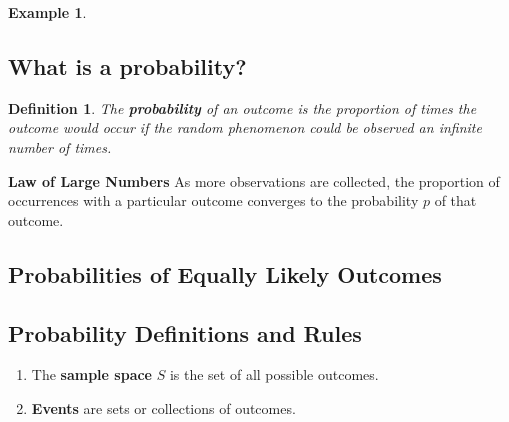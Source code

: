\documentclass[12pt]{amsart}
\newtheorem{definition}[theorem]{Definition}
\newtheorem{example}[theorem]{Example}
\begin{document}
{\begin{example}
\begin{enumerate}
\begin{enumerate}


\end{enumerate}

\end{enumerate}
\end{example} 


\newpage

\subsection{What is a probability?}

\begin{definition} The \textbf{probability} of an outcome is the proportion of times the outcome would occur if the random phenomenon could be observed an infinite number of times.
\end{definition}

\vspace{1cm}
\textbf{Law of Large Numbers}\newline
 As more observations are collected, the proportion of occurrences with a particular outcome converges to the probability $p$ of that outcome.

\vspace{7cm}
\subsection{Probabilities of Equally Likely Outcomes}


\newpage

\subsection{Probability Definitions and Rules}

\begin{enumerate}

\item[1.] The \textbf{sample space} $S$ is the set of all possible outcomes.
\vspace{1cm}

\item[2.] \textbf{Events} are sets or collections of outcomes.
\vspace{1cm}


\end{enumerate}}
\end{document}
